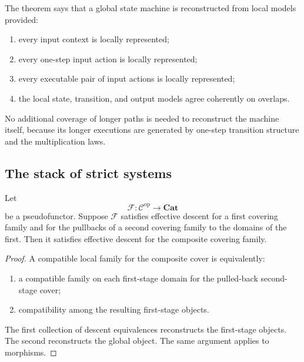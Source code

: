 \begin{remark}
\label{rem:systems-form-effective-descent}
The theorem says that a global state machine is reconstructed from local
models provided:
\begin{enumerate}
    \item every input context is locally represented;
    \item every one-step input action is locally represented;
    \item every executable pair of input actions is locally represented;
    \item the local state, transition, and output models agree coherently on
    overlaps.
\end{enumerate}

No additional coverage of longer paths is needed to reconstruct the machine
itself, because its longer executions are generated by one-step transition
structure and the multiplication laws.
\end{remark}

\subsection{The stack of strict systems}
\label{subsec:stack-of-strict-systems}

\begin{lemma}
\label{lem:composition-effective-descent}
Let
\[
    \mathcal F:
    \mathcal C^{\mathrm{op}}\to\mathbf{Cat}
\]
be a pseudofunctor. Suppose \(\mathcal F\) satisfies effective descent for a
first covering family and for the pullbacks of a second covering family to the
domains of the first. Then it satisfies effective descent for the composite
covering family.
\end{lemma}

\begin{proof}
A compatible local family for the composite cover is equivalently:
\begin{enumerate}
    \item a compatible family on each first-stage domain for the pulled-back
    second-stage cover;
    \item compatibility among the resulting first-stage objects.
\end{enumerate}
The first collection of descent equivalences reconstructs the first-stage
objects. The second reconstructs the global object. The same argument applies
to morphisms.
\end{proof}

